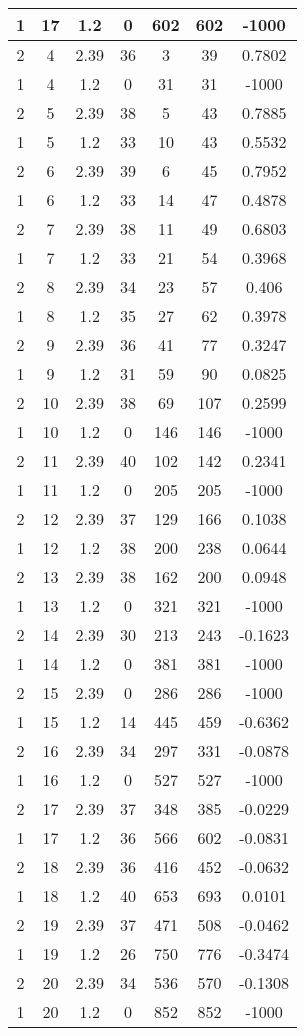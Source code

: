 \documentclass[letterpaper, 12pt]{article}
\begin{document}
\begin{longtable}{|c|c|c|c|c|c|c|}
\hline
1 & 17 & 1.2 & 0 & 602 & 602 & -1000 \\
\hline
2 & 4 & 2.39 & 36 & 3 & 39 & 0.7802 \\
\hline
1 & 4 & 1.2 & 0 & 31 & 31 & -1000 \\
\hline
2 & 5 & 2.39 & 38 & 5 & 43 & 0.7885 \\
\hline
1 & 5 & 1.2 & 33 & 10 & 43 & 0.5532 \\
\hline
2 & 6 & 2.39 & 39 & 6 & 45 & 0.7952 \\
\hline
1 & 6 & 1.2 & 33 & 14 & 47 & 0.4878 \\
\hline
2 & 7 & 2.39 & 38 & 11 & 49 & 0.6803 \\
\hline
1 & 7 & 1.2 & 33 & 21 & 54 & 0.3968 \\
\hline
2 & 8 & 2.39 & 34 & 23 & 57 & 0.406 \\
\hline
1 & 8 & 1.2 & 35 & 27 & 62 & 0.3978 \\
\hline
2 & 9 & 2.39 & 36 & 41 & 77 & 0.3247 \\
\hline
1 & 9 & 1.2 & 31 & 59 & 90 & 0.0825 \\
\hline
2 & 10 & 2.39 & 38 & 69 & 107 & 0.2599 \\
\hline
1 & 10 & 1.2 & 0 & 146 & 146 & -1000 \\
\hline
2 & 11 & 2.39 & 40 & 102 & 142 & 0.2341 \\
\hline
1 & 11 & 1.2 & 0 & 205 & 205 & -1000 \\
\hline
2 & 12 & 2.39 & 37 & 129 & 166 & 0.1038 \\
\hline
1 & 12 & 1.2 & 38 & 200 & 238 & 0.0644 \\
\hline
2 & 13 & 2.39 & 38 & 162 & 200 & 0.0948 \\
\hline
1 & 13 & 1.2 & 0 & 321 & 321 & -1000 \\
\hline
2 & 14 & 2.39 & 30 & 213 & 243 & -0.1623 \\
\hline
1 & 14 & 1.2 & 0 & 381 & 381 & -1000 \\
\hline
2 & 15 & 2.39 & 0 & 286 & 286 & -1000 \\
\hline
1 & 15 & 1.2 & 14 & 445 & 459 & -0.6362 \\
\hline
2 & 16 & 2.39 & 34 & 297 & 331 & -0.0878 \\
\hline
1 & 16 & 1.2 & 0 & 527 & 527 & -1000 \\
\hline
2 & 17 & 2.39 & 37 & 348 & 385 & -0.0229 \\
\hline
1 & 17 & 1.2 & 36 & 566 & 602 & -0.0831 \\
\hline
2 & 18 & 2.39 & 36 & 416 & 452 & -0.0632 \\
\hline
1 & 18 & 1.2 & 40 & 653 & 693 & 0.0101 \\
\hline
2 & 19 & 2.39 & 37 & 471 & 508 & -0.0462 \\
\hline
1 & 19 & 1.2 & 26 & 750 & 776 & -0.3474 \\
\hline
2 & 20 & 2.39 & 34 & 536 & 570 & -0.1308 \\
\hline
1 & 20 & 1.2 & 0 & 852 & 852 & -1000 \\
\hline
\end{longtable}
\end{document}
